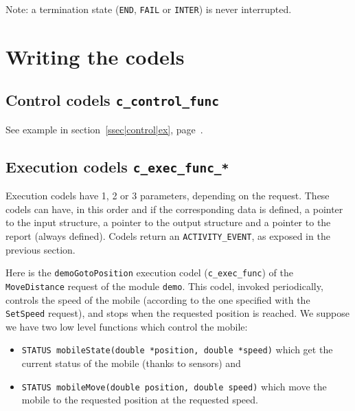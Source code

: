 Note: a termination state ({\tt END}, {\tt FAIL} or {\tt INTER}) is never
interrupted.



\section{Writing the codels}
\label{sec|codels|writing}


\subsection{Control codels  {\tt c\_control\_func}}

See        example            in           section~\ref{ssec|control|ex},
page~\pageref{ssec|control|ex}.

\subsection{Execution codels  {\tt c\_exec\_func\_*}}

Execution  codels have 1,  2 or 3  parameters,  depending on the request.
These codels can have,  in this order and   if the corresponding  data is
defined,  a pointer to  the   input structure,  a pointer  to  the output
structure and a pointer to the report (always  defined). Codels return an
{\tt ACTIVITY\_EVENT}, as exposed in the previous section.

Here is the {\tt demoGotoPosition}  execution codel ({\tt c\_exec\_func})
of the {\tt MoveDistance} request of the module {\tt demo}. This codel,
invoked periodically, controls the speed of the mobile (according to the
one specified with the {\tt SetSpeed} request), and stops when the
requested position is reached. We suppose we have two low level functions
which control the mobile:

\begin{itemize}
\item {\tt STATUS mobileState(double *position, double *speed)} which get
the current status of the mobile (thanks to sensors) and
\item {\tt STATUS mobileMove(double position, double speed)} which move
the mobile to the requested position at the requested speed.
\end{itemize}

